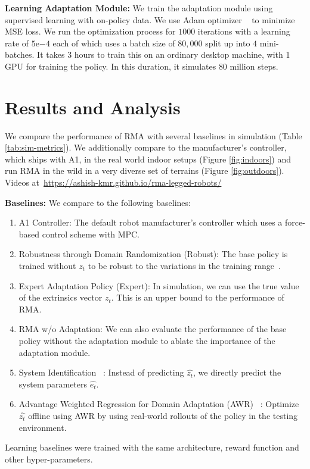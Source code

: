 \documentclass[conference]{IEEEtran}
\newcommand{\algo}{RMA}
\newcommand{\urllink}{https://youtu.be/p_pPrJXQk90}
\newcommand{\pagelink}{https://ashish-kmr.github.io/rma-legged-robots/}
\begin{document}
\vspace{0.6em}\noindent\textbf{Learning Adaptation Module:} We train the adaptation module using supervised learning with on-policy data. We use Adam optimizer ~\cite{kingma2014adam} to minimize MSE loss. We run the optimization process for $1000$ iterations with a learning rate of $5\mathrm{e}{-4}$ each of which uses a batch size of $80,000$ split up into $4$ mini-batches. It takes $3$ hours to train this on an ordinary desktop machine, with 1 GPU for training the policy. In this duration, it simulates $80$ million steps.

\section{Results and Analysis}
\label{sec:results}
We compare the performance of \algo{} with several baselines in simulation (Table \ref{tab:sim-metrics}). We additionally compare to the manufacturer's controller, which ships with A1, in the real world indoor setups (Figure \ref{fig:indoors}) and run \algo{} in the wild in a very diverse set of terrains (Figure \ref{fig:outdoors}). Videos at~\url{\pagelink}

\vspace{0.6em}\noindent\textbf{Baselines:} We compare to the following baselines:
\begin{enumerate}
    \item A1 Controller: The default robot manufacturer's controller which uses a force-based control scheme with MPC.
    \item Robustness through Domain Randomization (Robust): The base policy is trained without $z_t$ to be robust to the variations in the training range~\cite{tobin2017domain,peng2018sim}. 
    \item Expert Adaptation Policy (Expert): In simulation, we can use the true value of the extrinsics vector $z_t$. This is an upper bound to the performance of \algo{}. 
    \item \algo{} w/o Adaptation: We can also evaluate the performance of the base policy without the adaptation module to ablate the importance of the adaptation module.
    \item System Identification ~\cite{yu2017preparing}: Instead of predicting $\hat{z_t}$, we directly predict the system parameters $\hat{e_t}$. 
    \item Advantage Weighted Regression for Domain Adaptation (AWR) ~\cite{peng2020learning}: %
    Optimize $\hat{z_t}$ offline using AWR by using real-world rollouts of the policy in the testing environment.
\end{enumerate}
Learning baselines were trained with the same architecture, reward function and other hyper-parameters.  
\end{document}

